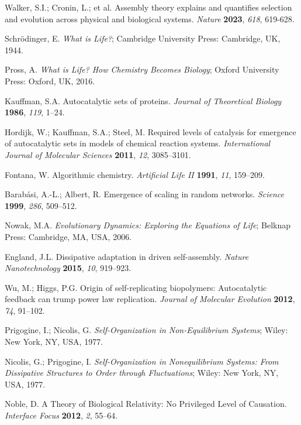 \documentclass[preprint,12pt]{elsarticle}
\begin{document}
\begin{thebibliography}{999}
Walker, S.I.; Cronin, L.; et al. Assembly theory explains and quantifies selection and evolution across physical and biological systems. \textit{Nature} \textbf{2023}, \textit{618}, 619-628.

Schrödinger, E. \textit{What is Life?}; Cambridge University Press: Cambridge, UK, 1944.

Pross, A. \textit{What is Life? How Chemistry Becomes Biology}; Oxford University Press: Oxford, UK, 2016.

Kauffman, S.A. Autocatalytic sets of proteins. \textit{Journal of Theoretical Biology} \textbf{1986}, \textit{119}, 1–24.

Hordijk, W.; Kauffman, S.A.; Steel, M. Required levels of catalysis for emergence of autocatalytic sets in models of chemical reaction systems. \textit{International Journal of Molecular Sciences} \textbf{2011}, \textit{12}, 3085–3101.

Fontana, W. Algorithmic chemistry. \textit{Artificial Life II} \textbf{1991}, \textit{11}, 159–209.

Barabási, A.-L.; Albert, R. Emergence of scaling in random networks. \textit{Science} \textbf{1999}, \textit{286}, 509–512.

Nowak, M.A. \textit{Evolutionary Dynamics: Exploring the Equations of Life}; Belknap Press: Cambridge, MA, USA, 2006.

England, J.L. Dissipative adaptation in driven self-assembly. \textit{Nature Nanotechnology} \textbf{2015}, \textit{10}, 919–923.

Wu, M.; Higgs, P.G. Origin of self-replicating biopolymers: Autocatalytic feedback can trump power law replication. \textit{Journal of Molecular Evolution} \textbf{2012}, \textit{74}, 91–102.

Prigogine, I.; Nicolis, G. \textit{Self-Organization in Non-Equilibrium Systems}; Wiley: New York, NY, USA, 1977.

Nicolis, G.; Prigogine, I. \textit{Self-Organization in Nonequilibrium Systems: From Dissipative Structures to Order through Fluctuations}; Wiley: New York, NY, USA, 1977.

Noble, D. A Theory of Biological Relativity: No Privileged Level of Causation. \textit{Interface Focus} \textbf{2012}, \textit{2}, 55–64.


\end{thebibliography}
\end{document}
